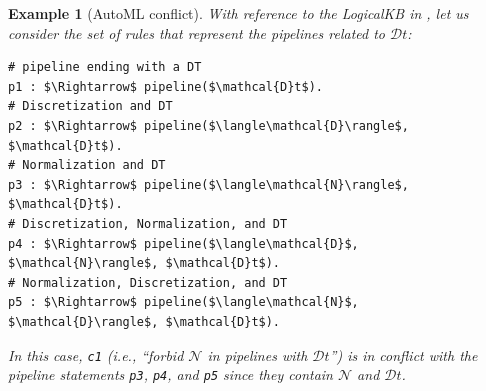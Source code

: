 \documentclass[5p,times]{elsarticle}
\newtheorem{example}{Example}
\newtheorem{definition}{Definition}
\begin{document}
\begin{example}[AutoML conflict]
With reference to the LogicalKB in , let us consider the set of rules that represent the pipelines related to $\mathcal{D}t$:
\begin{lstlisting}[mathescape=true]
# pipeline ending with a DT
p1 : $\Rightarrow$ pipeline($\mathcal{D}t$).
# Discretization and DT
p2 : $\Rightarrow$ pipeline($\langle\mathcal{D}\rangle$, $\mathcal{D}t$).
# Normalization and DT
p3 : $\Rightarrow$ pipeline($\langle\mathcal{N}\rangle$, $\mathcal{D}t$).
# Discretization, Normalization, and DT
p4 : $\Rightarrow$ pipeline($\langle\mathcal{D}$, $\mathcal{N}\rangle$, $\mathcal{D}t$).
# Normalization, Discretization, and DT
p5 : $\Rightarrow$ pipeline($\langle\mathcal{N}$, $\mathcal{D}\rangle$, $\mathcal{D}t$).
\end{lstlisting}
In this case, \texttt{c1} (i.e., ``forbid $\mathcal{N}$ in pipelines with $\mathcal{D}t$'') is in conflict with the \emph{pipeline} statements \texttt{p3}, \texttt{p4}, and \texttt{p5} since they contain $\mathcal{N}$ and $\mathcal{D}t$.
\label{ex:conflict}
\end{example}



\end{document}
